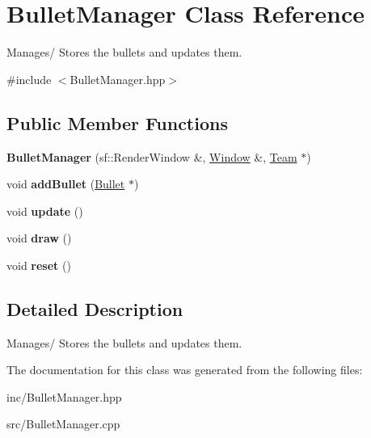 \hypertarget{class_bullet_manager}{\section{Bullet\+Manager Class Reference}
\label{class_bullet_manager}
}


Manages/ Stores the bullets and updates them.  




{\ttfamily \#include $<$Bullet\+Manager.\+hpp$>$}

\subsection*{Public Member Functions}
\begin{DoxyCompactItemize}
\item 
\hypertarget{class_bullet_manager_ada078710fd6d61b209d102749a4360ad}{{\bfseries Bullet\+Manager} (sf\+::\+Render\+Window \&, \hyperlink{class_window}{Window} \&, \hyperlink{class_team}{Team} $\ast$)}\label{class_bullet_manager_ada078710fd6d61b209d102749a4360ad}

\item 
\hypertarget{class_bullet_manager_a27c7ef0185d54e290944a9b350057e36}{void {\bfseries add\+Bullet} (\hyperlink{class_bullet}{Bullet} $\ast$)}\label{class_bullet_manager_a27c7ef0185d54e290944a9b350057e36}

\item 
\hypertarget{class_bullet_manager_ae8638f3b70fe44a15413e1107ea806fe}{void {\bfseries update} ()}\label{class_bullet_manager_ae8638f3b70fe44a15413e1107ea806fe}

\item 
\hypertarget{class_bullet_manager_a998a35d3f85dd54cbc805990ad0af95b}{void {\bfseries draw} ()}\label{class_bullet_manager_a998a35d3f85dd54cbc805990ad0af95b}

\item 
\hypertarget{class_bullet_manager_a3350b0e2778aca1fc400f91629759d65}{void {\bfseries reset} ()}\label{class_bullet_manager_a3350b0e2778aca1fc400f91629759d65}

\end{DoxyCompactItemize}


\subsection{Detailed Description}
Manages/ Stores the bullets and updates them. 

The documentation for this class was generated from the following files\+:\begin{DoxyCompactItemize}
\item 
inc/Bullet\+Manager.\+hpp\item 
src/Bullet\+Manager.\+cpp\end{DoxyCompactItemize}
